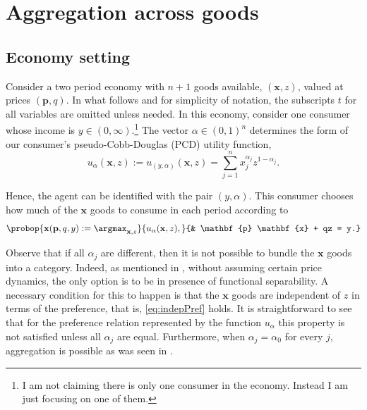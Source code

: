 \documentclass[english, a4paper,12pt]{article}
\begin{document}
\section{Aggregation across goods} \label{sec:OneGood}

\subsection{Economy setting} \label{ssec:OneGoodDescr}
Consider a two period economy with $n+1$ goods available, $(\mathbf{x}, z)$, valued at prices $(\mathbf{p}, q)$.  In what follows and for simplicity of notation, the subscripts $t$ for all variables are omitted unless needed. In this economy, consider one consumer whose income is $y \in (0,\infty)$.\footnote{I am not claiming there is only one consumer in the economy. Instead I am just focusing on one of them.} The vector $\alpha \in (0,1)^{n}$ determines the form of our consumer's pseudo-Cobb-Douglas (PCD) utility function,
	$$u_{\alpha}(\mathbf{x},z) := u_{(y,\alpha)}(\mathbf{x},z) = \sum_{j=1}^{n} x_{j}^{\alpha_{j}}z^{1-\alpha_{j}}.$$

Hence, the agent can be identified with the pair $(y,\alpha)$. This consumer chooses how much of the $\mathbf{x}$ goods to consume in each period according to
	\begin{equation} \label{eq:probdisagg2}
		\probop{\mathbf{x}(\mathbf{p}, q, y) 
			:= \argmax_{\mathbf{x}, z}}{u_{\alpha}(\mathbf{x}, z),}
				{&	\mathbf{p} \mathbf{x} + qz = y.}
	\end{equation} 

Observe that if all $\alpha_{j}$ are different, then it is not possible to bundle the $\mathbf{x}$ goods into a category. Indeed, as mentioned in , without assuming certain price dynamics, the only option is to be in presence of functional separability. A necessary condition for this to happen is that the $\mathbf{x}$ goods are independent of $z$ in terms of the preference, that is, \eqref{eq:indepPref} holds. It is straightforward to see that for the preference relation represented by the function $u_{\alpha}$ this property is not satisfied unless all $\alpha_{j}$ are equal. Furthermore, when $\alpha_{j} = \alpha_{0}$ for every $j$, aggregation is possible as was seen in . 

\end{document}
